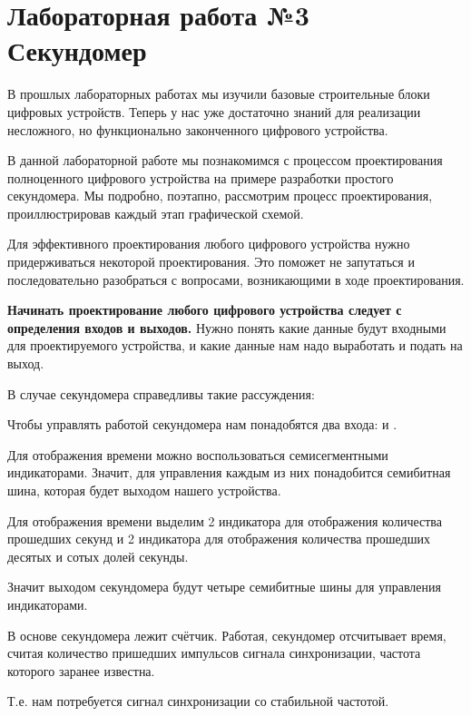 \chapter{Лабораторная работа №3\\Секундомер} 

\par{В прошлых лабораторных работах мы изучили базовые строительные блоки цифровых устройств. Теперь у нас уже достаточно знаний для реализации несложного, но функционально законченного цифрового устройства.}

\par{В данной лабораторной работе мы познакомимся с процессом проектирования полноценного цифрового устройства на примере разработки простого секундомера. Мы подробно, поэтапно, рассмотрим процесс проектирования, проиллюстрировав каждый этап графической схемой.}

\par{Для эффективного проектирования любого цифрового устройства нужно придерживаться некоторой  проектирования. Это поможет не запутаться и последовательно разобраться с вопросами, возникающими в ходе проектирования.}

\par{\textbf{Начинать проектирование любого цифрового устройства следует с определения входов и выходов.} Нужно понять какие данные будут входными для проектируемого устройства, и какие данные нам надо выработать и подать на выход.}

\vspace{4mm}
\par{В случае секундомера справедливы такие рассуждения:}
\par{Чтобы управлять работой секундомера нам понадобятся два входа:  и .}
\par{Для отображения времени можно воспользоваться семисегментными индикаторами. Значит, для управления каждым из них понадобится семибитная шина, которая будет выходом нашего устройства.}
\par{Для отображения времени выделим 2 индикатора для отображения количества прошедших секунд и 2 индикатора для отображения количества прошедших десятых и сотых долей секунды.}
\par{Значит выходом секундомера будут четыре семибитные шины для управления индикаторами.}
\par{В основе секундомера лежит счётчик. Работая, секундомер отсчитывает время, считая количество пришедших импульсов сигнала синхронизации, частота которого заранее известна.}
\par{Т.е. нам потребуется сигнал синхронизации со стабильной частотой.}
\vspace{4mm}


